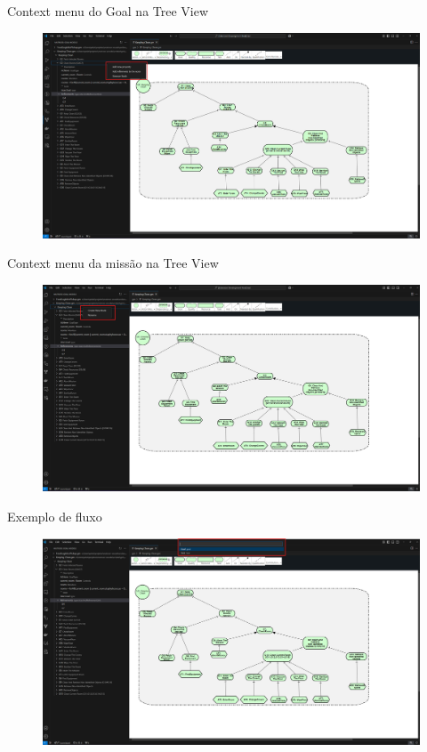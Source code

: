\documentclass{beamer}
\begin{document}
\begin{frame}{Context menu do Goal na Tree View}
  \begin{figure}[!h]
    \centering
    \includegraphics[width=1\textwidth]{submenu_on_right_click.png} 
    \caption{}
  \end{figure}
\end{frame}
\begin{frame}{Context menu da missão na Tree View}
  \begin{figure}[!h]
    \centering
    \includegraphics[width=1\textwidth]{rightclickonmission.png} 
    \caption{}
  \end{figure}
\end{frame}
\begin{frame}{Exemplo de fluxo}
  \begin{figure}[!h]
    \centering
    \includegraphics[width=1\textwidth]{flow1.png} 
    \caption{}
  \end{figure}
\end{frame}
\end{document}
